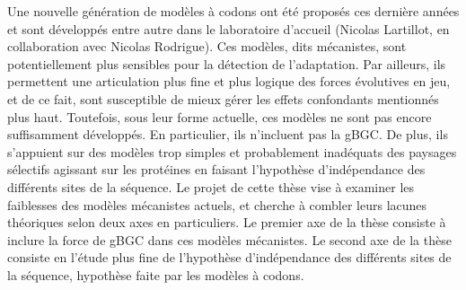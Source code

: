 Une nouvelle génération de modèles à codons ont été proposés ces dernière années et sont développés entre autre dans le laboratoire d'accueil (Nicolas Lartillot, en collaboration avec Nicolas Rodrigue).
Ces modèles, dits mécanistes, sont potentiellement plus sensibles pour la détection de l'adaptation.
Par ailleurs, ils permettent une articulation plus fine et plus logique des forces évolutives en jeu, et de ce fait, sont susceptible de mieux gérer les effets confondants mentionnés plus haut.
Toutefois, sous leur forme actuelle, ces modèles ne sont pas encore suffisamment développés.
En particulier, ils n'incluent pas la gBGC.
De plus, ils s’appuient sur des modèles trop simples et probablement inadéquats des paysages sélectifs agissant sur les protéines en faisant l'hypothèse d’indépendance des différents sites de la séquence.
Le projet de cette thèse vise à examiner les faiblesses des modèles mécanistes actuels, et cherche à combler leurs lacunes théoriques selon deux axes en particuliers.
Le premier axe de la thèse consiste à inclure la force de gBGC dans ces modèles mécanistes.
Le second axe de la thèse consiste en l'étude plus fine de l’hypothèse d’indépendance des différents sites de la séquence, hypothèse faite par les modèles à codons.
